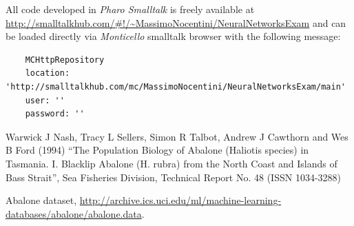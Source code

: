 \documentclass[10pt,a4paper]{article}
\begin{document}
    All code developed in \emph{Pharo Smalltalk} is freely available at
    \url{http://smalltalkhub.com/#!/~MassimoNocentini/NeuralNetworksExam}
    and can be loaded directly via \emph{Monticello} smalltalk browser
    with the following message:
    \begin{adjustwidth}{-2cm}{}
    \begin{verbatim}
    MCHttpRepository
    location: 'http://smalltalkhub.com/mc/MassimoNocentini/NeuralNetworksExam/main'
    user: ''
    password: ''
    \end{verbatim}
    \end{adjustwidth}    
      
    \begin{thebibliography}{9}

    Warwick J Nash, Tracy L Sellers, Simon R Talbot, Andrew J Cawthorn and
    Wes B Ford (1994) ``The Population Biology of Abalone (Haliotis
    species) in Tasmania. I. Blacklip Abalone (H. rubra) from the North
    Coast and Islands of Bass Strait'', Sea Fisheries Division, Technical
    Report No. 48 (ISSN 1034-3288)


      Abalone dataset,
      \url{http://archive.ics.uci.edu/ml/machine-learning-databases/abalone/abalone.data}.



    \end{thebibliography}
\end{document}

